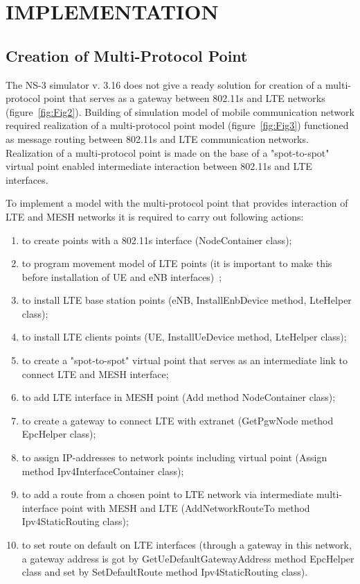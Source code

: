 \documentclass[a4paper,twoside]{article}
\begin{document}
\section{IMPLEMENTATION}

\subsection{Creation of Multi-Protocol Point}

The NS-3 simulator v. 3.16 does not give a ready solution for creation of a multi-protocol point that serves as a gateway between 802.11s and LTE networks (figure~\ref{fig:Fig2}). Building of simulation model of mobile communication network required realization of a multi-protocol point model (figure~\ref{fig:Fig3}) functioned as message routing between 802.11s and LTE communication networks. Realization of a multi-protocol point is made on the base of a "spot-to-spot" virtual point enabled intermediate interaction between 802.11s and LTE interfaces.

To implement a model with the multi-protocol point that provides interaction of LTE and MESH networks it is required to carry out following actions:

\begin{enumerate}
\item to create points with a 802.11s interface (NodeContainer class);

\item to program movement model of LTE points (it is important to make this before installation of UE and eNB interfaces)~\cite{LTE};

\item to install LTE base station points (eNB, InstallEnbDevice method, LteHelper class);

\item to install LTE clients points (UE, InstallUeDevice method, LteHelper class);

\item to create a "spot-to-spot" virtual point that serves as an intermediate link to connect LTE and MESH interface;

\item to add LTE interface in MESH point (Add method NodeContainer class);

\item to create a gateway to connect LTE with extranet (GetPgwNode method EpcHelper class);

\item to assign IP-addresses to network points including virtual point (Assign method Ipv4InterfaceContainer class);

\item to add a route from a chosen point to LTE network via intermediate multi-interface point with MESH and LTE (AddNetworkRouteTo method Ipv4StaticRouting class);

\item to set route on default on LTE interfaces (through a gateway in this network, a gateway address is got by GetUeDefaultGatewayAddress method EpcHelper class and set by SetDefaultRoute method Ipv4StaticRouting class).
\end{enumerate}
\end{document}

